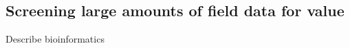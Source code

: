 \subsection{Screening large amounts of field data for value}
\label{sec:screeningdata}

Describe bioinformatics